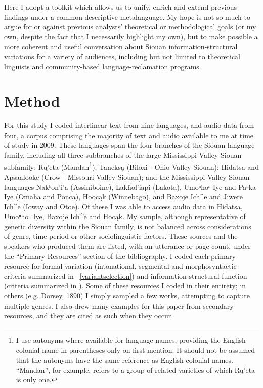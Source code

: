 \documentclass[output=paper]{LSP/langsci}
\begin{document}
	Here I adopt a toolkit which allows us to unify, enrich and extend previous findings under a common descriptive metalanguage. My hope is not so much to argue for or against previous analysts’ theoretical or methodological goals (or my own, despite the fact that I necessarily highlight my own), but to make possible a more coherent and useful conversation about Siouan information-structural variations for a variety of audiences, including but not limited to theoretical linguists and community-based language-reclamation programs.

\section{Method}

For this study I coded interlinear text from nine languages, and audio data from four, a corpus comprising the majority of text and audio available to me at time of study in 2009. These languages span the four branches of the Siouan language family, including all three subbranches of the large Mississippi Valley Siouan subfamily: Rų’eta (Mandan\footnote{I use autonyms where available for language names, providing the English colonial name in parentheses only on first mention. It should not be assumed that the autonyms have the same reference as English colonial names. “Mandan”, for example, refers to a group of related varieties of which Rų’eta is only one.}); Taneksą (Biloxi - Ohio Valley Siouan); Hidatsa and Apsaalooke (Crow - Missouri Valley Siouan); and the Mississippi Valley Siouan languages Nakʰon’i’a (Assiniboine), Lakȟol’iapi (Lakota), Umoⁿhoⁿ Iye and Paⁿka Iye (Omaha and Ponca), Hoocąk (Winnebago), and Baxoje Ich\^{}e and Jiwere Ich\^{}e (Ioway and Otoe). Of these I was able to access audio data in Hidatsa, Umoⁿhoⁿ Iye, Baxoje Ich\^{}e and Hocąk. My sample, although representative of genetic diversity within the Siouan family, is not balanced across considerations of genre, time period or other sociolinguistic factors. These sources and the speakers who produced them are listed, with an utterance or page count, under the “Primary Resources” section of the bibliography. I coded each primary resource for formal variation (intonational, segmental and morphosyntactic criteria summarized in --\ref{variantselection}) and information-structural function (criteria summarized in ). Some of these resources I coded in their entirety; in others (e.g. Dorsey, 1890) I simply sampled a few works, attempting to capture multiple genres. I also drew many examples for this paper from secondary resources, and they are cited as such when they occur.
\end{document}
